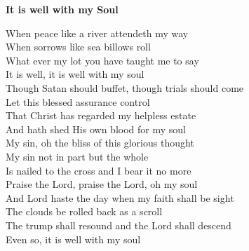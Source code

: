 \textbf{It is well with my Soul}

When peace like a river attendeth my way \\
When sorrows like sea billows roll \\
What ever my lot you have taught me to say \\
It is well, it is well with my soul \\

Though Satan should buffet, though trials should come \\
Let this blessed assurance control \\
That Christ has regarded my helpless estate \\
And hath shed His own blood for my soul \\

My sin, oh the bliss of this glorious thought \\
My sin not in part but the whole \\
Is nailed to the cross and I bear it no more \\
Praise the Lord, praise the Lord, oh my soul \\

And Lord haste the day when my faith shall be sight \\
The clouds be rolled back as a scroll \\
The trump shall resound and the Lord shall descend \\
Even so, it is well with my soul \\

